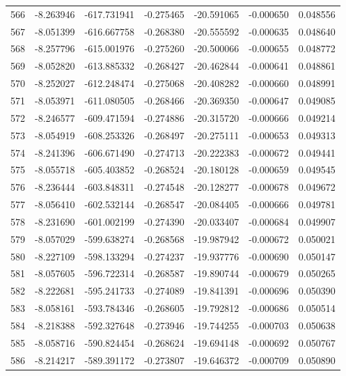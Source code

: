 \begin{tabular}{rrrrrrr}
 566 &  -8.263946 & -617.731941 & -0.275465 &  -20.591065 &   -0.000650 &  0.048556 \\
 567 &  -8.051399 & -616.667758 & -0.268380 &  -20.555592 &   -0.000635 &  0.048640 \\
 568 &  -8.257796 & -615.001976 & -0.275260 &  -20.500066 &   -0.000655 &  0.048772 \\
 569 &  -8.052820 & -613.885332 & -0.268427 &  -20.462844 &   -0.000641 &  0.048861 \\
 570 &  -8.252027 & -612.248474 & -0.275068 &  -20.408282 &   -0.000660 &  0.048991 \\
 571 &  -8.053971 & -611.080505 & -0.268466 &  -20.369350 &   -0.000647 &  0.049085 \\
 572 &  -8.246577 & -609.471594 & -0.274886 &  -20.315720 &   -0.000666 &  0.049214 \\
 573 &  -8.054919 & -608.253326 & -0.268497 &  -20.275111 &   -0.000653 &  0.049313 \\
 574 &  -8.241396 & -606.671490 & -0.274713 &  -20.222383 &   -0.000672 &  0.049441 \\
 575 &  -8.055718 & -605.403852 & -0.268524 &  -20.180128 &   -0.000659 &  0.049545 \\
 576 &  -8.236444 & -603.848311 & -0.274548 &  -20.128277 &   -0.000678 &  0.049672 \\
 577 &  -8.056410 & -602.532144 & -0.268547 &  -20.084405 &   -0.000666 &  0.049781 \\
 578 &  -8.231690 & -601.002199 & -0.274390 &  -20.033407 &   -0.000684 &  0.049907 \\
 579 &  -8.057029 & -599.638274 & -0.268568 &  -19.987942 &   -0.000672 &  0.050021 \\
 580 &  -8.227109 & -598.133294 & -0.274237 &  -19.937776 &   -0.000690 &  0.050147 \\
 581 &  -8.057605 & -596.722314 & -0.268587 &  -19.890744 &   -0.000679 &  0.050265 \\
 582 &  -8.222681 & -595.241733 & -0.274089 &  -19.841391 &   -0.000696 &  0.050390 \\
 583 &  -8.058161 & -593.784346 & -0.268605 &  -19.792812 &   -0.000686 &  0.050514 \\
 584 &  -8.218388 & -592.327648 & -0.273946 &  -19.744255 &   -0.000703 &  0.050638 \\
 585 &  -8.058716 & -590.824454 & -0.268624 &  -19.694148 &   -0.000692 &  0.050767 \\
 586 &  -8.214217 & -589.391172 & -0.273807 &  -19.646372 &   -0.000709 &  0.050890 \\

\end{tabular}
